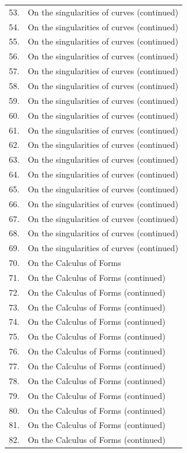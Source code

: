 \documentclass[11pt,a4paper]{book}
\begin{document}
\begin{center}
\begin{longtable}{rp{}}
53. & On the singularities of curves (continued) \\
54. & On the singularities of curves (continued) \\
55. & On the singularities of curves (continued) \\
56. & On the singularities of curves (continued) \\
57. & On the singularities of curves (continued) \\
58. & On the singularities of curves (continued) \\
59. & On the singularities of curves (continued) \\
60. & On the singularities of curves (continued) \\
61. & On the singularities of curves (continued) \\
62. & On the singularities of curves (continued) \\
63. & On the singularities of curves (continued) \\
64. & On the singularities of curves (continued) \\
65. & On the singularities of curves (continued) \\
66. & On the singularities of curves (continued) \\
67. & On the singularities of curves (continued) \\
68. & On the singularities of curves (continued) \\
69. & On the singularities of curves (continued) \\
70. & On the Calculus of Forms \\
71. & On the Calculus of Forms (continued) \\
72. & On the Calculus of Forms (continued) \\
73. & On the Calculus of Forms (continued) \\
74. & On the Calculus of Forms (continued) \\
75. & On the Calculus of Forms (continued) \\
76. & On the Calculus of Forms (continued) \\
77. & On the Calculus of Forms (continued) \\
78. & On the Calculus of Forms (continued) \\
79. & On the Calculus of Forms (continued) \\
80. & On the Calculus of Forms (continued) \\
81. & On the Calculus of Forms (continued) \\
82. & On the Calculus of Forms (continued) \\

\end{longtable}
\end{center}
\end{document}
